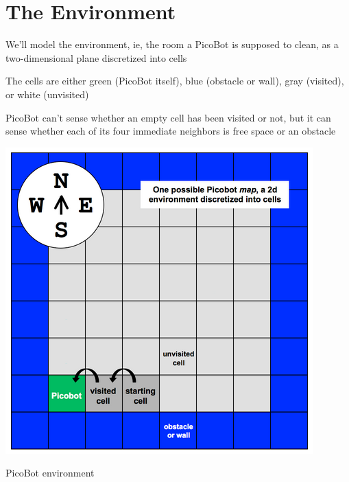 \documentclass[8pt,a4paper,compress]{beamer}
\begin{document}
\section{The Environment}
\begin{frame}[fragile]
\begin{minipage}{200pt}
We'll model the environment, ie, the room a PicoBot is supposed to clean, as a two-dimensional plane discretized into cells

\bigskip

The cells are either green (PicoBot itself), blue (obstacle or wall), gray (visited), or white (unvisited)

\bigskip

PicoBot can't sense whether an empty cell has been visited or not, but it can sense whether each of its four immediate neighbors is free space or an obstacle
\end{minipage}\hfill%
\begin{minipage}{100pt}
\begin{center}
\includegraphics[scale=0.25]{figures/picobot_env.png}

\smallskip

\tiny PicoBot environment
\end{center}
\end{minipage}

\smallskip

\begin{minipage}{200pt}


\end{minipage}
\end{frame}
\end{document}

